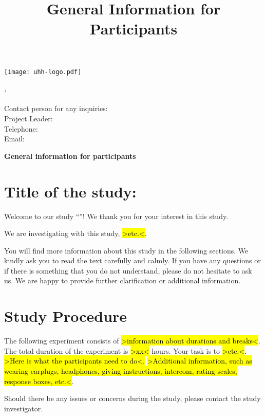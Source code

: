 \documentclass[11pt,twoside,a4paper]{article}
\title{\vspace{-1.5cm}\Large General Information for Participants
\vspace{-1.7cm}}
\begin{document}
\thispagestyle{fancy}

\begin{minipage}{0.5\linewidth}
    \texttt{[image: uhh-logo.pdf]}
\end{minipage}
\begin{minipage}{0.5\textwidth}\raggedleft{}
    \ApplicantUniversity{}, \ApplicantInstitute{}\\
    \ApplicantResearchGroup{}\\
    Contact person for any inquiries:\\
    Project Leader: \ProjectLeaderName{}\\
    Telephone: \InvestigatorPhoneNumber{}\\
    Email: \InvestigatorEmailAddress{}
\end{minipage}
\vspace*{1em}

\begin{flushleft}
    \Large\textbf{General information for participants}
\end{flushleft}

\section{Title of the study: \ProjectTitle{}}

Welcome to our study ``\ProjectTitle{}''!
We thank you for your interest in this study.

We are investigating with this study, \hl{>etc.<}.

You will find more information about this study in the following sections.
We kindly ask you to read the text carefully and calmly.
If you have any questions or if there is something that you do not understand, please do not hesitate to ask us.
We are happy to provide further clarification or additional information.

\section{Study Procedure}

The following experiment consists of \hl{>information about durations and breaks<}.
The total duration of the experiment is \hl{>xx<} hours.
Your task is to \hl{>etc.<}.
\hl{>Here is what the participants need to do<.}
\hl{>Additional information, such as wearing earplugs, headphones, giving instructions, intercom, rating scales, response boxes, etc.<}.

Should there be any issues or concerns during the study, please contact the study investigator.
\end{document}
